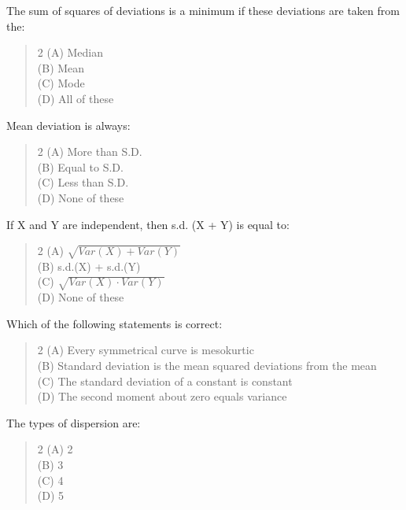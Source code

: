 \documentclass[11pt,a4paper]{article}
\begin{document}
\begin{mcqlist}
\item The sum of squares of deviations is a minimum if these deviations are taken from the:
\begin{quote}\begin{multicols}{2}
\noindent (A) Median \\
(B) Mean \\
(C) Mode \\
(D) All of these
\end{multicols}\end{quote}

\item Mean deviation is always:
\begin{quote}\begin{multicols}{2}
\noindent (A) More than S.D. \\
(B) Equal to S.D. \\
(C) Less than S.D. \\
(D) None of these
\end{multicols}\end{quote}

\item If X and Y are independent, then s.d. (X + Y) is equal to:
\begin{quote}\begin{multicols}{2}
\noindent (A) $\sqrt{Var(X)+Var(Y)}$ \\
(B) s.d.(X) + s.d.(Y) \\
(C) $\sqrt{Var(X) \cdot Var(Y)}$ \\
(D) None of these
\end{multicols}\end{quote}

\item Which of the following statements is correct:
\begin{quote}\begin{multicols}{2}
\noindent (A) Every symmetrical curve is mesokurtic \\
(B) Standard deviation is the mean squared deviations from the mean \\
(C) The standard deviation of a constant is constant \\
(D) The second moment about zero equals variance
\end{multicols}\end{quote}

\item The types of dispersion are:
\begin{quote}\begin{multicols}{2}
\noindent (A) 2 \\
(B) 3 \\
(C) 4 \\
(D) 5
\end{multicols}\end{quote}


\end{mcqlist}
\end{document}
